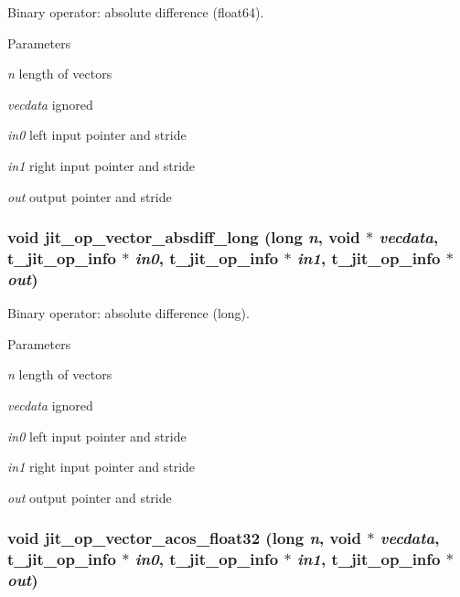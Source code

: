 Binary operator: absolute difference (float64). 
\begin{DoxyParams}{Parameters}
\item[{\em n}]length of vectors \item[{\em vecdata}]ignored \item[{\em in0}]left input pointer and stride \item[{\em in1}]right input pointer and stride \item[{\em out}]output pointer and stride \end{DoxyParams}
\hypertarget{group__opvecmod_ga07a76e07019b86d5e0cc26f7113f756d}{
\subsubsection[{jit\_\-op\_\-vector\_\-absdiff\_\-long}]{\setlength{\rightskip}{0pt plus 5cm}void jit\_\-op\_\-vector\_\-absdiff\_\-long (long {\em n}, \/  void $\ast$ {\em vecdata}, \/  {\bf t\_\-jit\_\-op\_\-info} $\ast$ {\em in0}, \/  {\bf t\_\-jit\_\-op\_\-info} $\ast$ {\em in1}, \/  {\bf t\_\-jit\_\-op\_\-info} $\ast$ {\em out})}}
\label{group__opvecmod_ga07a76e07019b86d5e0cc26f7113f756d}


Binary operator: absolute difference (long). 
\begin{DoxyParams}{Parameters}
\item[{\em n}]length of vectors \item[{\em vecdata}]ignored \item[{\em in0}]left input pointer and stride \item[{\em in1}]right input pointer and stride \item[{\em out}]output pointer and stride \end{DoxyParams}
\hypertarget{group__opvecmod_gacae820f353fd3677af02f3690d9beebf}{
\subsubsection[{jit\_\-op\_\-vector\_\-acos\_\-float32}]{\setlength{\rightskip}{0pt plus 5cm}void jit\_\-op\_\-vector\_\-acos\_\-float32 (long {\em n}, \/  void $\ast$ {\em vecdata}, \/  {\bf t\_\-jit\_\-op\_\-info} $\ast$ {\em in0}, \/  {\bf t\_\-jit\_\-op\_\-info} $\ast$ {\em in1}, \/  {\bf t\_\-jit\_\-op\_\-info} $\ast$ {\em out})}}
\label{group__opvecmod_gacae820f353fd3677af02f3690d9beebf}


